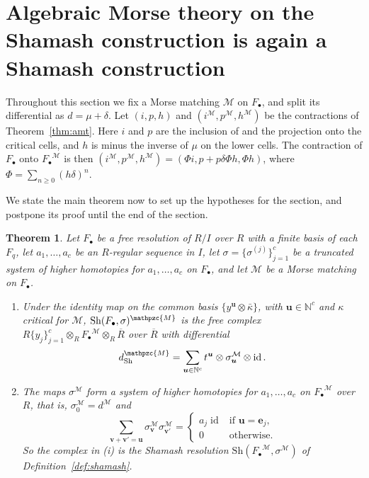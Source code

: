 \documentclass[12pt]{amsart}
\theoremstyle{plain}
\newtheorem{theorem}{Theorem}[section]
\theoremstyle{definition}
\newcommand{\F}{ {F_\bullet} }
\newcommand{\Rbar}{\overline{R}}
\newcommand{\M}{\mathcal{M}}
\newcommand{\lift}[1]{\mathpzc{#1}}
\newcommand{\id}{\operatorname{id}}
\newcommand{\N}{\mathbb{N}}
\newcommand{\Sh}{\mathrm{Sh}}
\begin{document}
\section{Algebraic Morse theory on the Shamash construction is again a Shamash construction}\label{sec:commute}
Throughout this section we fix a Morse matching $\M$ on $\F$, and split its differential as $d = \mu + \delta$. Let $(i, p, h)$ and $(i^{\M}, p^{\M}, h^{\M})$ be the contractions of Theorem~\ref{thm:amt}. Here $i$ and $p$ are the inclusion of and the projection onto the critical cells, and $h$ is minus the inverse of $\mu$ on the lower cells. The contraction of $\F$ onto $\F^{\M}$ is then $(i^{\M}, p^{\M}, h^{\M}) = (\Phi i, p + p\delta\Phi h, \Phi h)$, where $\Phi = \sum_{n \ge 0} (h\delta)^n$.

We state the main theorem now to set up the hypotheses for the section, and postpone its proof until the end of the section.

\begin{theorem}\label{thm:commute}
    Let $\F$ be a free resolution of $R/I$ over $R$ with a finite basis of each $F_q$, let $a_1, \dots, a_c$ be an $R$-regular sequence in $I$, let $\sigma = \{\sigma^{(j)}\}_{j=1}^c$ be a truncated system of higher homotopies for $a_1, \dots, a_c$ on $\F$, and let $\M$ be a Morse matching on $\F$.
    \begin{enumerate}[label={\rm(\roman*)},leftmargin=*,itemsep=4pt]
        \item Under the identity map on the common basis $\{y^{\boldsymbol{u}} \otimes \bar\kappa\}$, with $\boldsymbol{u} \in \N^c$ and $\kappa$ critical for $\M$, $\Sh(\F, \sigma)^{\lift{M}}$ is the free complex $R\{y_j\}_{j=1}^{c} \otimes_R \F^{\M} \otimes_R \Rbar$ over $\Rbar$ with differential
        \[
             d_{\Sh}^{\lift{M}}=\sum_{\boldsymbol{u} \in \N^c} t^{\boldsymbol{u}} \otimes \sigma^{\M}_{\boldsymbol{u}} \otimes \id .
        \]
        \item The maps $\sigma^{\M}$ form a system of higher homotopies for $a_1, \dots, a_c$ on $\F^{\M}$ over $R$, that is, $\sigma^{\M}_0 = d^{\M}$ and
        \[
            \sum_{\boldsymbol{v} + \boldsymbol{v'} = \boldsymbol{u}} \sigma^{\M}_{\boldsymbol{v}} \sigma^{\M}_{\boldsymbol{v'}} =
            \begin{cases}
                a_j \id & \text{if } \boldsymbol{u} = \boldsymbol{e}_j,\\
                0 & \text{otherwise.}
            \end{cases}
        \]
        So the complex in (i) is the Shamash resolution $\Sh(\F^{\M}, \sigma^{\M})$ of Definition~\ref{def:shamash}.
    \end{enumerate}
\end{theorem}
\end{document}
